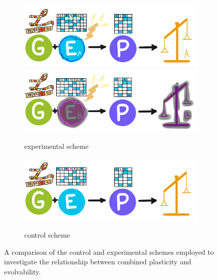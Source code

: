 \begin{figure}
  \centering
  \begin{subfigure}[b]{0.5\textwidth}
    \centering
    \includegraphics[width=\textwidth]{img/combinedschemeA} \\
    \includegraphics[width=\textwidth]{img/combinedschemeB}
    \caption{experimental scheme}
    \label{subfig:directscheme}
  \end{subfigure}%
  \hfill
  \begin{subfigure}[b]{0.5\textwidth}
    \centering
    
    \includegraphics[width=\textwidth]{img/modelscheme} \\
 \vspace{5ex}
    \caption{control scheme}
     \label{subfig:controlscheme}
  \end{subfigure}
  \captionsetup{singlelinecheck=off,justification=raggedright}
  \caption{A comparison of the control and experimental schemes employed to investigate the relationship between combined plasticity and evolvability.}
  \label{fig:combined_plasticity_scheme}
\end{figure}